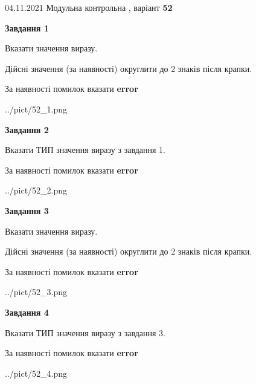\documentclass[11pt, ukrainian]{article}
\begin{document}
{04.11.2021 Модульна контрольна , варіант  \No \textbf { 52 }\par}
{
\begin {large}
{\begin {center}\textbf{Завдання 1}\end {center}}\par
Вказати значення виразу. \par
Дійсні значення (за наявності) округлити до 2 знаків після крапки. \par
За наявності помилок вказати \textbf{error}

\begin{center}
	{../pict/52_1.png}
\end{center}
\newpage

{\begin {center}\textbf{Завдання 2}\end {center}}\par
Вказати ТИП значення виразу з завдання 1. \par
За наявності помилок вказати \textbf{error}

\begin{center}
	{../pict/52_2.png}
\end{center}
\newpage

{\begin {center}\textbf{Завдання 3}\end {center}}\par
Вказати значення виразу. \par
Дійсні значення (за наявності) округлити до 2 знаків після крапки. \par
За наявності помилок вказати \textbf{error}

\begin{center}
	{../pict/52_3.png}
\end{center}
\newpage

{\begin {center}\textbf{Завдання 4}\end {center}}\par
Вказати ТИП значення виразу з завдання 3. \par
За наявності помилок вказати \textbf{error}

\begin{center}
	{../pict/52_4.png}
\end{center}
\newpage


\end{large}}
\end{document}
